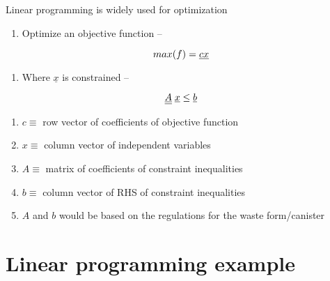 \documentclass[aspectratio=1610,pdftex,dvipsnames,compress,xcolor={dvipsnames}]{beamer}
\begin{document}
\begin{frame}{Linear programming is widely used for optimization}
    \begin{enumerate}[series=outerlist,topsep=0pt,itemsep=1pt,leftmargin=*,label=(\arabic*)]
        \item[]Optimize an objective function --
    \end{enumerate}

    \vspace*{\fill}

    \begin{equation}
        \LARGE
        max(f) = \underline{c} \underline{x}
    \end{equation}

    \vspace*{\fill}

    \begin{enumerate}[series=outerlist,topsep=0pt,itemsep=1pt,leftmargin=*,label=(\arabic*)]
        \item[]Where $\underline{x}$ is constrained --
    \end{enumerate}

    \vspace*{\fill}

    \begin{equation}
        \LARGE
        \underline{\underline{A}} \; \underline{x} \leq \underline{b}
    \end{equation}

    \vspace*{\fill}

    \begin{enumerate}[series=outerlist,topsep=0pt,itemsep=5pt,leftmargin=*,label=(\arabic*)]
        \item[]$c \equiv$ row vector of coefficients of objective function
        \item[]$x \equiv$ column vector of independent variables
        \item[]$A \equiv$ matrix of coefficients of constraint inequalities
        \item[]$b \equiv$ column vector of RHS of constraint inequalities
        \item[]$A$ and $b$ would be based on the regulations for the waste form/canister
    \end{enumerate}
\end{frame}


\section{Linear programming example}
\end{document}
